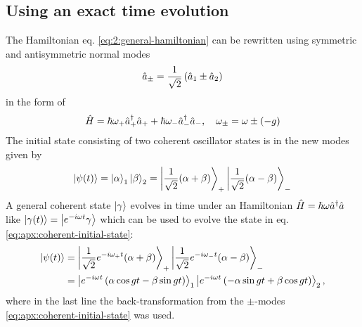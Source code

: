 \subsection{Using an exact time evolution}
\label{apx:general-coherent-state-evolution}
The Hamiltonian eq. \eqref{eq:2:general-hamiltonian} can be rewritten using symmetric and antisymmetric normal modes
\begin{equation}
  \hat{a}_\pm = \frac{1}{\sqrt{2}} \left( \hat{a}_1 \pm \hat{a}_2 \right)
\end{equation}
in the form of 
\begin{equation}
  \hat{H} = \hbar \omega_+ \hat{a}^\dagger_+\hat{a}_+ + \hbar \omega_- \hat{a}^\dagger_-\hat{a}_- ,  \quad  \omega_\pm = \omega \pm (-g)
\end{equation}
The initial state consisting of two coherent oscillator states is in the new modes given by
\begin{equation}\label{eq:apx:coherent-initial-state}
  \ket{\psi(t)} = \ket{\alpha}_1\ket{\beta}_2 = \ket{\frac{1}{\sqrt{2}} (\alpha + \beta)}_+\ket{\frac{1}{\sqrt{2}} (\alpha - \beta)}_-
\end{equation}
A general coherent state $\ket{\gamma}$ evolves in time under an Hamiltonian $\hat{H} = \hbar \omega \hat{a}^\dagger \hat{a}$ like $\ket{\gamma(t)} = \ket{e^{-i\omega t} \gamma}$ which can be used to evolve the state in eq. \eqref{eq:apx:coherent-initial-state}:
\begin{align}
  \ket{\psi(t)} 
  &= \ket{ \frac{1}{\sqrt{2}} e^{-i\omega_+t} (\alpha + \beta) }_+\ket{ \frac{1}{\sqrt{2}} e^{-i\omega_-t} (\alpha - \beta) }_- \\
  &= \ket{ e^{-i\omega t} \left( \alpha \cos gt - \beta \sin gt \right) }_1 \ket{ e^{-i\omega t} \left( - \alpha \sin gt + \beta \cos gt \right) }_2, 
\end{align}
where in the last line the back-transformation from the $\pm$-modes \eqref{eq:apx:coherent-initial-state} was used.


